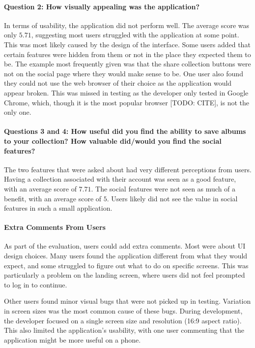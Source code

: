 \paragraph{Question 2: How visually appealing was the application?}
In terms of usability, the application did not perform well. The average score was only $5.71$, suggesting most users struggled with the application at some point. This was most likely caused by the design of the interface. Some users added that certain features were hidden from them or not in the place they expected them to be. The example most frequently given was that the share collection buttons were not on the social page where they would make sense to be. One user also found they could not use the web browser of their choice as the application would appear broken. This was missed in testing as the developer only tested in Google Chrome, which, though it is the most popular browser [TODO: CITE], is not the only one.

\paragraph{Questions 3 and 4: How useful did you find the ability to save albums to your collection? How valuable did/would you find the social features?}
The two features that were asked about had very different perceptions from users. Having a collection associated with their account was seen as a good feature, with an average score of $7.71$. The social features were not seen as much of a benefit, with an average score of $5$. Users likely did not see the value in social features in such a small application.

\paragraph{Extra Comments From Users}
As part of the evaluation, users could add extra comments. Most were about UI design choices. Many users found the application different from what they would expect, and some struggled to figure out what to do on specific screens. This was particularly a problem on the landing screen, where users did not feel prompted to log in to continue.

Other users found minor visual bugs that were not picked up in testing. Variation in screen sizes was the most common cause of these bugs. During development, the developer focused on a single screen size and resolution (16:9 aspect ratio). This also limited the application's usability, with one user commenting that the application might be more useful on a phone.

